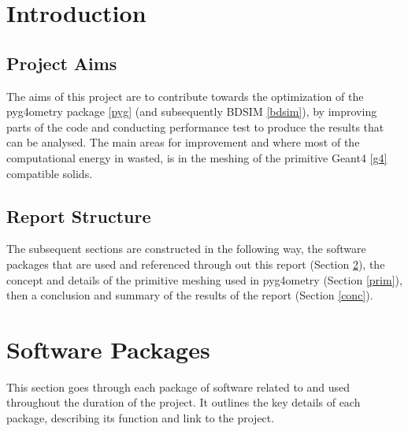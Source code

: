 \documentclass[12pt,a4paper]{article}
\begin{document}
\begin{titlepage}
\end{titlepage}
\leavevmode\thispagestyle{empty}\newpage
\tableofcontents
\thispagestyle{empty}
\newpage
\onecolumn

\small
\setcounter{page}{1}


\section{Introduction}

\subsection{Project Aims}
The aims of this project are to contribute towards the optimization of the pyg4ometry package \ref{pyg} (and subsequently BDSIM \ref{bdsim}), by improving parts of the code and conducting performance test to produce the results that can be analysed. The main areas for improvement and where most of the computational energy in wasted, is in the meshing of the primitive Geant4 \ref{g4} compatible solids.

\subsection{Report Structure}
The subsequent sections are constructed in the following way, the software packages that are used and referenced through out this report (Section \ref{packs}), the concept and details of the primitive meshing used in pyg4ometry (Section \ref{prim}), then a conclusion and summary of the results of the report (Section \ref{conc}).



\section{Software Packages}
\label{packs}
This section goes through each package of software related to and used throughout the duration of the project. It outlines the key details of each package, describing its function and link to the project.
\end{document}
